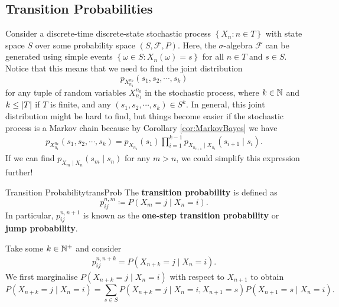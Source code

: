 \documentclass[math, code]{amznotes}
\theoremstyle{remark}
\begin{document}
\subsection{Transition Probabilities}
Consider a discrete-time discrete-state stochastic process $\left\{X_n \colon n \in T\right\}$ with state space $S$ over some probability space $\left(S, \mathcal{F}, P\right)$. Here, the $\sigma$-algebra $\mathcal{F}$ can be generated using simple events $\left\{\omega \in S \colon X_n\left(\omega\right) = s\right\}$ for all $n \in T$ and $s \in S$. Notice that this means that we need to find the joint distribution 
\begin{equation*}
    p_{X_{n_1}^{n_k}}\left(s_1, s_2, \cdots, s_k\right)
\end{equation*}
for any tuple of random variables $X_{n_1}^{n_k}$ in the stochastic process, where $k \in \mathbb{N}$ and $k \leq {\left\lvert {T} \right\rvert}$ if $T$ is finite, and any $\left(s_1, s_2, \cdots, s_k\right) \in S^k$. In general, this joint distribution might be hard to find, but things become easier if the stochastic process is a Markov chain because by Corollary \ref{cor:MarkovBayes} we have
\begin{align*}
    p_{X_{n_1}^{n_k}}\left(s_1, s_2, \cdots, s_k\right) = p_{X_{n_1}}\left(s_1\right)\prod_{i = 1}^{k - 1}p_{X_{n_{i + 1}} \mid X_{n_i}}\left(s_{i + 1} \mid s_i\right).
\end{align*}
If we can find $p_{X_m \mid X_n}\left(s_m \mid s_n\right)$ for any $m > n$, we could simplify this expression further! 
\begin{dfnbox}{Transition Probability}{transProb}
    The {\color{red} \textbf{transition probability}} is defined as 
    \begin{equation*}
        p_{ij}^{n, m} \coloneqq P\left(X_{m} = j \mid X_n = i\right).
    \end{equation*}
    In particular, $p_{ij}^{n, n + 1}$ is known as the {\color{red} \textbf{one-step transition probability}} or {\color{red} \textbf{jump probability}}.
\end{dfnbox}
Take some $k \in \mathbb{N}^+$ and consider
\begin{align*}
    p_{ij}^{n, n + k} = P\left(X_{n + k} = j \mid X_n = i\right).
\end{align*}
We first marginalise $P\left(X_{n + k} = j \mid X_n = i\right)$ with respect to $X_{n + 1}$ to obtain
\begin{equation*}
    P\left(X_{n + k} = j \mid X_n = i\right) = \sum_{s \in S}P\left(X_{n + k} = j \mid X_n = i, X_{n + 1} = s\right)P\left(X_{n + 1} = s \mid X_n = i\right).
\end{equation*}
\end{document}
